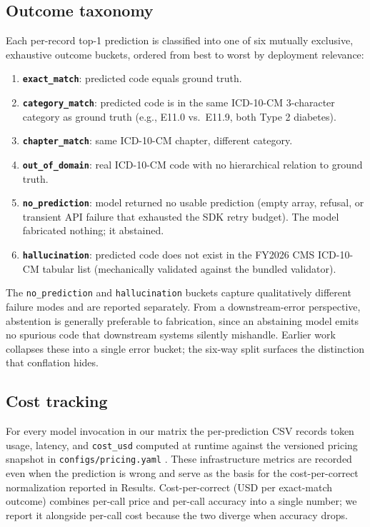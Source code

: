 \subsection{Outcome taxonomy}\label{outcome-taxonomy}

Each per-record top-1 prediction is classified into one of six
mutually exclusive, exhaustive outcome buckets, ordered from best
to worst by deployment relevance:

\begin{enumerate}
\def\labelenumi{\arabic{enumi}.}
\tightlist
\item
  \textbf{\texttt{exact\_match}}: predicted code equals ground truth.
\item
  \textbf{\texttt{category\_match}}: predicted code is in the same ICD-10-CM
  3-character category as ground truth (e.g., E11.0 vs.~E11.9, both
  Type 2 diabetes).
\item
  \textbf{\texttt{chapter\_match}}: same ICD-10-CM chapter, different category.
\item
  \textbf{\texttt{out\_of\_domain}}: real ICD-10-CM code with no hierarchical
  relation to ground truth.
\item
  \textbf{\texttt{no\_prediction}}: model returned no usable prediction (empty
  array, refusal, or transient API failure that exhausted the SDK
  retry budget). The model fabricated nothing; it abstained.
\item
  \textbf{\texttt{hallucination}}: predicted code does not exist in the FY2026
  CMS ICD-10-CM tabular list (mechanically validated against the
  bundled validator).
\end{enumerate}

The \texttt{no\_prediction} and \texttt{hallucination} buckets capture
qualitatively different failure modes and are reported separately.
From a downstream-error perspective, abstention is generally
preferable to fabrication, since an abstaining model emits no
spurious code that downstream systems silently mishandle. Earlier work \autocite{Soroush2024}
collapses these into a single error bucket; the six-way split
surfaces the distinction that conflation hides.

\subsection{Cost tracking}\label{cost-tracking}

For every model invocation in our matrix the per-prediction CSV
records token usage, latency, and \texttt{cost\_usd} computed at runtime
against the versioned pricing snapshot in \texttt{configs/pricing.yaml}
\autocite{OpenAIPricing2026,GeminiPricing2026}. These infrastructure
metrics are recorded even when the prediction is wrong and serve
as the basis for the cost-per-correct normalization reported in
Results. Cost-per-correct (USD per exact-match outcome) combines per-call
price and per-call accuracy into a single number; we report it
alongside per-call cost because the two diverge when accuracy
drops.

